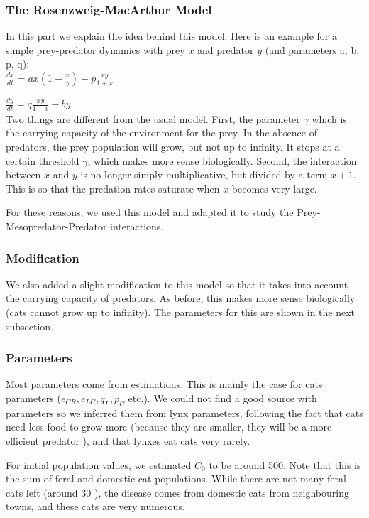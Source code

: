 \documentclass[12pt]{article}
\begin{document}
\subsubsection{The Rosenzweig-MacArthur Model}
\quad In this part we explain the idea behind this model. Here is an example for a simple prey-predator dynamics with prey $x$ and predator $y$ (and parameters a, b, p, q):\\

$\frac{dx}{dt} = ax(1 - \frac{x}{\gamma}) -p\frac{xy}{1 + x}$

$\frac{dy}{dt} = q\frac{xy}{1 + x} - by$\\

\quad Two things are different from the usual model. First, the parameter $\gamma$ which is the carrying capacity of the environment for the prey. In the absence of predators, the prey population will grow, but not up to infinity. It stops at a certain threshold $\gamma$, which makes more sense biologically. Second, the interaction between $x$ and $y$ is no longer simply multiplicative, but divided by a term $x + 1$. This is so that the predation rates saturate when $x$ becomes very large.

\quad For these reasons, we used this model and adapted it to study the Prey-Mesopredator-Predator interactions.
\subsubsection{Modification}
\quad We also added a slight modification to this model so that it takes into account the carrying capacity of predators. As before, this makes more sense biologically (cats cannot grow up to infinity). The parameters for this are shown in the next subsection.
\subsubsection{Parameters}


\quad Most parameters come from estimations. This is mainly the case for cats parameters ($e_{CR}, e_{LC}, q_{L}, p_{C}$ etc.). We could not find a good source with parameters so we inferred them from lynx parameters, following the fact that cats need less food to grow more (because they are smaller, they will be a more efficient predator \cite{holt_alternative_2007}), and that lynxes eat cats very rarely. 

\quad For initial population values, we estimated $C_{0}$ to be around 500. Note that this is the sum of feral and domestic cat populations. While there are not many feral cats left (around 30 \cite{soto_navarro_surprising_2013}), the disease comes from domestic cats from neighbouring towns, and these cats are very numerous.
\end{document}
